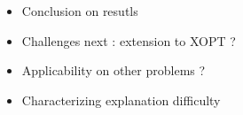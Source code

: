 \begin{itemize}
    \item Conclusion on resutls
    \item Challenges next : extension to XOPT ? 
    \item Applicability on other problems ?
    \item Characterizing explanation difficulty
\end{itemize}